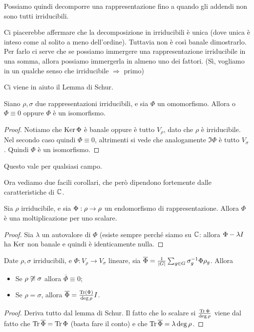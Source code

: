 	Possiamo quindi decomporre una rappresentazione fino a quando gli addendi non sono tutti irriducibili.

	Ci piacerebbe affermare che la decomposizione in irriducibili è unica (dove unica è inteso come al solito a meno dell'ordine). Tuttavia non è così banale dimostrarlo. Per farlo ci serve che se possiamo immergere una rappresentazione irriducibile in una somma, allora possiamo immergerla in almeno uno dei fattori. (Sì, vogliamo in un qualche senso che irriducibile $\Rightarrow$ primo)

	Ci viene in aiuto il Lemma di Schur.

	\begin{mytheorem}
		Siano $\rho,\sigma$ due rappresentazioni irriducibili, e sia $\Phi$ un omomorfismo. Allora o $\Phi \equiv 0$ oppure $\Phi$ è un isomorfismo.
	\end{mytheorem}
	\begin{proof}
		Notiamo che $\operatorname{Ker} \Phi$ è banale oppure è tutto $V_\rho$, dato che $\rho$ è irriducibile. Nel secondo caso quindi $\Phi\equiv 0$, altrimenti si vede che analogamente $\Im \Phi$ è tutto $V_\sigma$. Quindi $\Phi$ è un isomorfismo.
	\end{proof}

	Questo vale per qualsiasi campo.
	
	Ora vediamo due facili corollari, che però dipendono fortemente dalle caratteristiche di $\mathbb C$.

	\begin{mycor}
		Sia $\rho$ irriducibile, e sia $\Phi: \rho \rightarrow \rho$ un endomorfismo di rappresentazione. Allora $\Phi$ è una moltiplicazione per uno scalare. 
	\end{mycor}
	\begin{proof}
		Sia $\lambda$ un autovalore di $\Phi$ (esiste sempre perché siamo su $\mathbb C$: allora $\Phi-\lambda I$ ha $\operatorname{Ker}$ non banale e quindi è identicamente nulla.
	\end{proof}

	\begin{mycor}
		Date $\rho,\sigma$ irriducibili, e $\Phi: V_\rho \rightarrow V_\sigma$ lineare, sia $\overline \Phi = \frac 1{\left|G\right|} \sum_{g\in G} \sigma_g^{-1} \Phi \rho_g$. Allora
		\begin{itemize}
		\item Se $\rho \not \cong \sigma$ allora $\bar \Phi\equiv 0$;
		\item Se $\rho = \sigma$, allora $\overline \Phi = \frac{\operatorname{Tr}(\Phi)}{\deg \rho}I$.
		\end{itemize}
	\end{mycor}
	\begin{proof}
		Deriva tutto dal lemma di Schur. Il fatto che lo scalare si $\frac{\operatorname{Tr} \Phi}{\deg \rho}$ viene dal fatto che $\operatorname{Tr} \overline \Phi = \operatorname{Tr} \Phi$ (basta fare il conto) e che $\operatorname{Tr} \overline \Phi = \lambda \deg \rho$.
	\end{proof}

